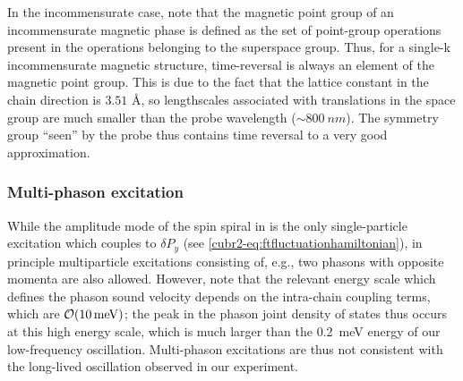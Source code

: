In the incommensurate case, note that the magnetic point group of an incommensurate magnetic phase is defined as the set of point-group operations present in the operations belonging to the superspace group.
Thus, for a single-k incommensurate magnetic structure, time-reversal is always an element of the magnetic point group.
This is due to the fact that the lattice constant in the chain direction is $3.51$ \si{\angstrom}, so lengthscales associated with translations in the space group are much smaller than the probe wavelength ($\sim\qty{800}{nm}$).
The symmetry group ``seen'' by the probe thus contains time reversal to a very good approximation.

\subsubsection{Multi-phason excitation}

While the amplitude mode of the spin spiral in  is the only single-particle excitation which couples to $\delta P_y$ (see \cref{cubr2-eq:ftfluctuationhamiltonian}), in principle multiparticle excitations consisting of, e.g., two phasons with opposite momenta are also allowed.
However, note that the relevant energy scale which defines the phason sound velocity depends on the intra-chain coupling terms, which are $\mathcal{O}(\qty{10}{meV})$; the peak in the phason joint density of states thus occurs at this high energy scale, which is much larger than the \qty{0.2}{meV} energy of our low-frequency oscillation.
Multi-phason excitations are thus not consistent with the long-lived oscillation observed in our experiment.
